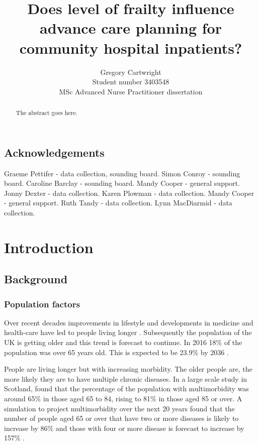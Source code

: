\documentclass
[
	12pt,
	a4paper,
	oneside,
]{report}
\begin{document}
\author{Gregory Cartwright\\
	Student number 3403548\\
	MSc Advanced Nurse Practitioner dissertation
}
\title{Does level of frailty influence advance care planning 
	for community hospital inpatients?
}

\maketitle

\begin{abstract}
The abstract goes here.
\end{abstract}

\section*{Acknowledgements}
Graeme Pettifer - data collection, sounding board.
Simon Conroy - sounding board.
Caroline Barclay - sounding board.
Mandy Cooper - general support.
Jonny Dexter - data collection.
Karen Plowman - data collection.
Mandy Cooper - general support.
Ruth Tandy - data collection.
Lynn MacDiarmid - data collection.

\tableofcontents 

\chapter{Introduction}

\section{Background}

\subsection{Population factors}

Over recent decades 
improvements in lifestyle and developments in medicine and health-care have led
to people living longer \parencite{nao:08,ons:17}. Subsequently the population 
of the UK is getting older and this trend is forecast to continue.
In 2016 18\% of the population was over 65 years old. This is expected to be
23.9\% by 2036 \parencite{ons:17}.

People are living longer but with increasing morbidity. The older people are, 
the more
likely they are to have multiple chronic diseases. In a large scale study in
Scotland, \textcite{barnett:12} found that the percentage of the population with 
multimorbidity was around 
65\% in those aged 65 to 84, rising to 81\% in those aged 85 or over. A simulation 
to project multimorbidity over the next 20 years found that the number of people
aged 65 or over that have two or more diseases is likely to increase by 86\% and 
those with four or more disease is forecast to increase by 157\%
\parencite{kingston:18}. 
\end{document}
